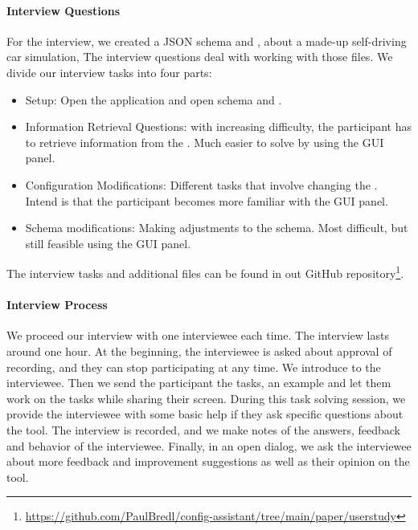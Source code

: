 \paragraph{Interview Questions}
For the interview, we created a JSON schema and \cfgfile{}, about a made-up self-driving car simulation,
The interview questions deal with working with those files.
We divide our interview tasks into four parts:
\begin{itemize}
    \item Setup: Open the application and open schema and \cfgfile.
    \item Information Retrieval Questions: with increasing difficulty, the participant has to retrieve information from the \cfgfile{}.
    Much easier to solve by using the GUI panel.
    \item Configuration Modifications: Different tasks that involve changing the \cfgfile{}.
    Intend is that the participant becomes more familiar with the GUI panel.
    \item Schema modifications: Making adjustments to the schema.
    Most difficult, but still feasible using the GUI panel.
\end{itemize}

The interview tasks and additional files can be found in out GitHub repository\footnote{\url{https://github.com/PaulBredl/config-assistant/tree/main/paper/userstudy}}.

\paragraph{Interview Process}
We proceed our interview with one interviewee each time.
The interview lasts around one hour.
At the beginning, the interviewee is asked about approval of recording, and they can stop participating at any time.
We introduce \toolname{} to the interviewee.
Then we send the participant the tasks, an example \cfgfile{} and let them work on the tasks while sharing their screen.
During this task solving session, we provide the interviewee with some basic help if they ask specific questions about the tool.
The interview is recorded, and we make notes of the answers, feedback and behavior of the interviewee.
Finally, in an open dialog, we ask the interviewee about more feedback and improvement suggestions as well as their opinion on the tool.

